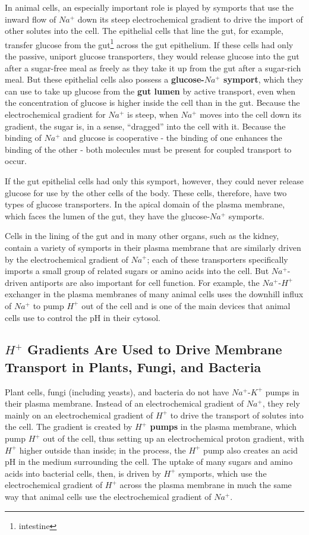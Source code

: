 In animal cells, an especially important role is played by symports that
use the inward flow of $Na^{+}$ down its steep electrochemical gradient to
drive the import of other solutes into the cell. The epithelial cells that line
the gut, for example, transfer glucose from the gut\footnote{intestine} across the gut epithelium.
If these cells had only the passive, uniport glucose transporters,
they would release glucose into the gut after a sugar-free meal as freely
as they take it up from the gut after a sugar-rich meal. But these epithelial
cells also possess a \textbf{glucose-$Na^{+}$ symport}, which they can use to take up
glucose from the \textbf{gut lumen} by active transport, even when the concentration of
glucose is higher inside the cell than in the gut. Because the
electrochemical gradient for $Na^{+}$ is steep, when $Na^{+}$ moves into the cell
down its gradient, the sugar is, in a sense, “dragged” into the cell with it.
Because the binding of $Na^{+}$ and glucose is cooperative -
the binding of one enhances the binding of the other - both molecules
must be present for coupled transport to occur.

If the gut epithelial cells had only this symport, however, they could never
release glucose for use by the other cells of the body. These cells, therefore,
have two types of glucose transporters. In the apical domain of the plasma
membrane, which faces the lumen of the gut, they have the glucose-$Na^{+}$
symports.

Cells in the lining of the gut and in many other organs, such as the kidney,
contain a variety of symports in their plasma membrane that are similarly
driven by the electrochemical gradient of $Na^{+}$; each of these transporters
specifically imports a small group of related sugars or amino acids into
the cell. But $Na^{+}$-driven antiports are also important for cell function. For
example, the $Na^{+}$-$H^{+}$ exchanger in the plasma membranes of many animal
cells uses the downhill influx of $Na^{+}$ to pump $H^{+}$ out of the cell and
is one of the main devices that animal cells use to control the pH in their
cytosol.

\subsection{$H^{+}$ Gradients Are Used to Drive Membrane Transport in Plants, Fungi, and Bacteria}

Plant cells, fungi (including yeasts), and bacteria do not have $Na^{+}$-$K^{+}$
pumps in their plasma membrane. Instead of an electrochemical gradient
of $Na^{+}$, they rely mainly on an electrochemical gradient of $H^{+}$ to drive the
transport of solutes into the cell. The gradient is created by \textbf{$H^{+}$ pumps} in
the plasma membrane, which pump $H^{+}$ out of the cell, thus setting up an
electrochemical proton gradient, with $H^{+}$ higher outside than inside; in the
process, the $H^{+}$ pump also creates an acid pH in the medium surrounding
the cell. The uptake of many sugars and amino acids into bacterial cells,
then, is driven by $H^{+}$ symports, which use the electrochemical gradient of
$H^{+}$ across the plasma membrane in much the same way that animal cells
use the electrochemical gradient of $Na^{+}$.

